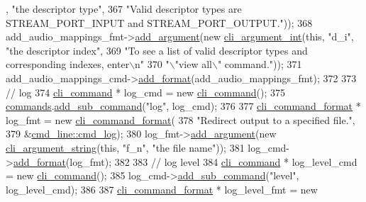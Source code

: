 \begin{DoxyCode}
      , \textcolor{stringliteral}{"the descriptor type"},
367                                                                  \textcolor{stringliteral}{"Valid descriptor types are
       STREAM\_PORT\_INPUT and STREAM\_PORT\_OUTPUT."}));
368     add\_audio\_mappings\_fmt->\hyperlink{classcli__command__format_ac3fc6d13a227c195d5ee6f7b78eba9cd}{add\_argument}(\textcolor{keyword}{new} \hyperlink{classcli__argument__int}{cli\_argument\_int}(\textcolor{keyword}{this}, \textcolor{stringliteral}{"d\_i"}, \textcolor{stringliteral}{"the
       descriptor index"},
369                                                               \textcolor{stringliteral}{"To see a list of valid descriptor types and
       corresponding indexes, enter\(\backslash\)n"}
370                                                               \textcolor{stringliteral}{"\(\backslash\)"view all\(\backslash\)" command."}));
371     add\_audio\_mappings\_cmd->\hyperlink{classcli__command_aa9ec38e761644d946f8db2b920e39921}{add\_format}(add\_audio\_mappings\_fmt);
372 
373     \textcolor{comment}{// log}
374     \hyperlink{classcli__command}{cli\_command} * log\_cmd = \textcolor{keyword}{new} \hyperlink{classcli__command}{cli\_command}();
375     \hyperlink{classcmd__line_ae4fea670c2fdd2b60f7b5b6ad6fbaf1e}{commands}.\hyperlink{classcli__command_aa73a67e8ebb6facd4b40ced66279b226}{add\_sub\_command}(\textcolor{stringliteral}{"log"}, log\_cmd);
376 
377     \hyperlink{classcli__command__format}{cli\_command\_format} * log\_fmt = \textcolor{keyword}{new} \hyperlink{classcli__command__format}{cli\_command\_format}(
378         \textcolor{stringliteral}{"Redirect output to a specified file."},
379         &\hyperlink{classcmd__line_aec9ae277cca4d0df74e0d830fb173a98}{cmd\_line::cmd\_log});
380     log\_fmt->\hyperlink{classcli__command__format_ac3fc6d13a227c195d5ee6f7b78eba9cd}{add\_argument}(\textcolor{keyword}{new} \hyperlink{classcli__argument__string}{cli\_argument\_string}(\textcolor{keyword}{this}, \textcolor{stringliteral}{"f\_n"}, \textcolor{stringliteral}{"the file
       name"}));
381     log\_cmd->\hyperlink{classcli__command_aa9ec38e761644d946f8db2b920e39921}{add\_format}(log\_fmt);
382 
383     \textcolor{comment}{// log level}
384     \hyperlink{classcli__command}{cli\_command} * log\_level\_cmd = \textcolor{keyword}{new} \hyperlink{classcli__command}{cli\_command}();
385     log\_cmd->\hyperlink{classcli__command_aa73a67e8ebb6facd4b40ced66279b226}{add\_sub\_command}(\textcolor{stringliteral}{"level"}, log\_level\_cmd);
386 
387     \hyperlink{classcli__command__format}{cli\_command\_format} * log\_level\_fmt = \textcolor{keyword}{new} 

\end{DoxyCode}
